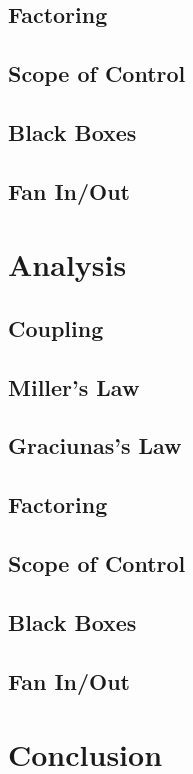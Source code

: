 \documentclass{article}
\begin{document}
	\subsection{Factoring}
	\subsection{Scope of Control}
	\subsection{Black Boxes}
	\subsection{Fan In/Out}
\section{Analysis}
	\subsection{Coupling}
	\subsection{Miller's Law}
	\subsection{Graciunas's Law}
	\subsection{Factoring}
	\subsection{Scope of Control}
	\subsection{Black Boxes}
	\subsection{Fan In/Out}
\section{Conclusion}	
\end{document}

